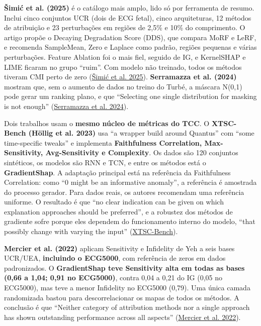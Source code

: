 \documentclass[11pt,a4paper]{article}
\begin{document}
\textbf{Šimić et al. (2025)} é o catálogo mais amplo, lido só por ferramenta de resumo. Inclui cinco conjuntos UCR (dois de ECG fetal), cinco arquiteturas, 12 métodos de atribuição e 23 perturbações em regiões de 2,5\% e 10\% do comprimento. O artigo propõe o Decaying Degradation Score (DDS), que compara MoRF e LeRF, e recomenda SampleMean, Zero e Laplace como padrão, regiões pequenas e várias perturbações. Feature Ablation foi o mais fiel, seguido de IG, e KernelSHAP e LIME ficaram no grupo ``ruim''. Com modelo não treinado, todos os métodos tiveram CMI perto de zero (\href{https://pmc.ncbi.nlm.nih.gov/articles/PMC12284047/}{Šimić et al. 2025}). \textbf{Serramazza et al. (2024)} mostram que, sem o aumento de dados no treino do Turbé, a máscara N(0,1) pode gerar um ranking plano, e que ``Selecting one single distribution for masking is not enough'' (\href{https://arxiv.org/abs/2406.12507}{Serramazza et al. 2024}).

Dois trabalhos usam o \textbf{mesmo núcleo de métricas do TCC}. O \textbf{XTSC-Bench (Höllig et al. 2023)} usa ``a wrapper build around Quantus'' com ``some time-specific tweaks'' e implementa \textbf{Faithfulness Correlation, Max-Sensitivity, Avg-Sensitivity e Complexity}. Os dados são 120 conjuntos sintéticos, os modelos são RNN e TCN, e entre os métodos está o \textbf{GradientShap}. A adaptação principal está na referência da Faithfulness Correlation: como ``0 might be an informative anomaly'', a referência é amostrada do processo gerador. Para dados reais, os autores recomendam uma referência uniforme. O resultado é que ``no clear indication can be given on which explanation approaches should be preferred'', e a robustez dos métodos de gradiente sofre porque eles dependem do funcionamento interno do modelo, ``that possibly change with varying the input'' (\href{https://arxiv.org/abs/2310.14957}{XTSC-Bench}).

\textbf{Mercier et al. (2022)} aplicam Sensitivity e Infidelity de Yeh a seis bases UCR/UEA, \textbf{incluindo o ECG5000}, com referência de zeros em dados padronizados. O \textbf{GradientShap teve Sensitivity alta em todas as bases (0,66 a 1,04; 0,91 no ECG5000)}, contra 0,04 a 0,21 do IG (0,05 no ECG5000), mas teve a menor Infidelity no ECG5000 (0,79). Uma única camada randomizada bastou para descorrelacionar os mapas de todos os métodos. A conclusão é que ``Neither category of attribution methods nor a single approach has shown outstanding performance across all aspects'' (\href{https://arxiv.org/abs/2202.03759}{Mercier et al. 2022}).
\end{document}
